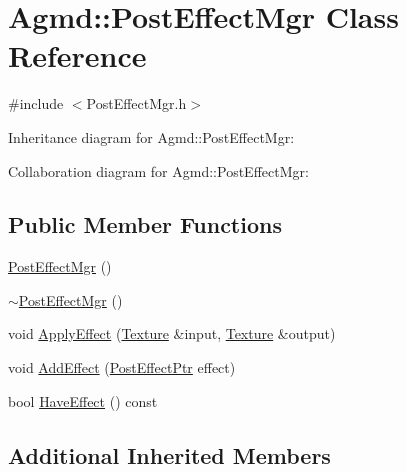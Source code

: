 \hypertarget{class_agmd_1_1_post_effect_mgr}{\section{Agmd\+:\+:Post\+Effect\+Mgr Class Reference}
\label{class_agmd_1_1_post_effect_mgr}
}


{\ttfamily \#include $<$Post\+Effect\+Mgr.\+h$>$}



Inheritance diagram for Agmd\+:\+:Post\+Effect\+Mgr\+:


Collaboration diagram for Agmd\+:\+:Post\+Effect\+Mgr\+:
\subsection*{Public Member Functions}
\begin{DoxyCompactItemize}
\item 
\hyperlink{class_agmd_1_1_post_effect_mgr_a791e1218f43f828f04680e8dab65ed73}{Post\+Effect\+Mgr} ()
\item 
\hyperlink{class_agmd_1_1_post_effect_mgr_a26ceb2cefdac32755d98f670284203f5}{$\sim$\+Post\+Effect\+Mgr} ()
\item 
void \hyperlink{class_agmd_1_1_post_effect_mgr_a25808f36e56fcf0381bc8699075e66b4}{Apply\+Effect} (\hyperlink{class_agmd_1_1_texture}{Texture} \&input, \hyperlink{class_agmd_1_1_texture}{Texture} \&output)
\item 
void \hyperlink{class_agmd_1_1_post_effect_mgr_acd586835c47a663106233cd8857ad6a8}{Add\+Effect} (\hyperlink{namespace_agmd_aded2fb07d1a048d839c8ffeeb56de7cb}{Post\+Effect\+Ptr} effect)
\item 
bool \hyperlink{class_agmd_1_1_post_effect_mgr_a962ccc33dd1315250b9ac8c1abcadfb2}{Have\+Effect} () const 
\end{DoxyCompactItemize}
\subsection*{Additional Inherited Members}


